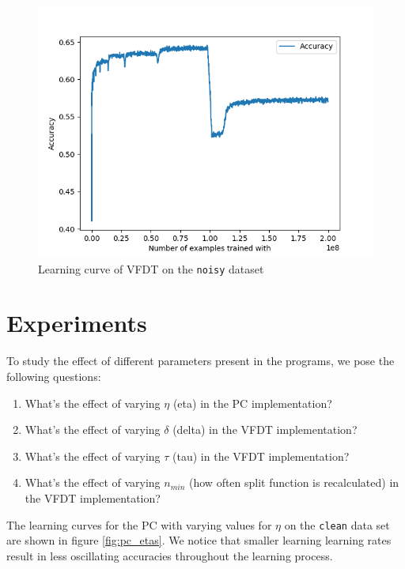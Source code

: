 \documentclass[12pt]{article}
\begin{document}
\begin{figure}
	\centering
	\includegraphics[width=.8\linewidth]{../plots/vfdt_noise}
	\caption{Learning curve of VFDT on the \texttt{noisy} dataset}
	\label{fig:vfdt_noise}
\end{figure}
\section{Experiments}
To study the effect of different parameters present in the programs, we pose the following questions:
\begin{enumerate}
	\item What's the effect of varying $\eta$ (eta) in the PC implementation?
	\item What's the effect of varying $\delta$ (delta) in the VFDT implementation?
	\item What's the effect of varying $\tau$ (tau) in the VFDT implementation?
	\item What's the effect of varying $n_{min}$ (how often split function is recalculated) in the VFDT implementation?
\end{enumerate}

The learning curves for the PC with varying values for $\eta$ on the \texttt{clean} data set are shown in figure \ref{fig:pc_etas}. We notice that smaller learning learning rates result in  less oscillating accuracies throughout the learning process. 
\end{document}
